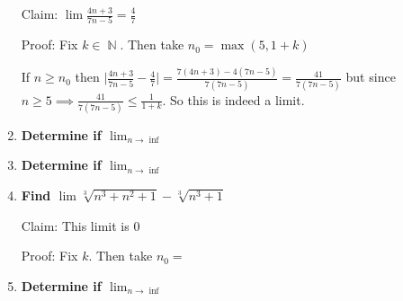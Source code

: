 \documentclass[10pt,a4paper]{article}
\DeclareMathOperator*{\N}{\mathbb{N}}
\begin{document}
\begin{enumerate}
        Claim: $\lim \frac{4n+3}{7n-5} = \frac{4}{7}$

        Proof: Fix $k \in \N$. Then take $n_0 = \max (5, {1+k})$

        If $n \geq n_0$ then $ \lvert \frac{4n+3}{7n-5}- \frac{4}{7} \rvert = \frac{7(4n+3) - 4(7n-5)}{7(7n-5)} = \frac{41}{7(7n-5)}$
        but since $n \geq 5 \implies \frac{41}{7(7n-5)} \leq \frac{1}{1+k}$. So this is indeed a limit.


    \item \textbf{Determine if $\lim_{n \to \inf}$ }
    \item \textbf{Determine if $\lim_{n \to \inf}$ }
    \item \textbf{Find $\lim \sqrt[3]{n^3+n^2+1} - \sqrt[3]{n^3+1}$}

        Claim: This limit is 0

        Proof: Fix $k$. Then take $n_0 = $
    \item \textbf{Determine if $\lim_{n \to \inf}$ }

\end{enumerate}
\end{document}
